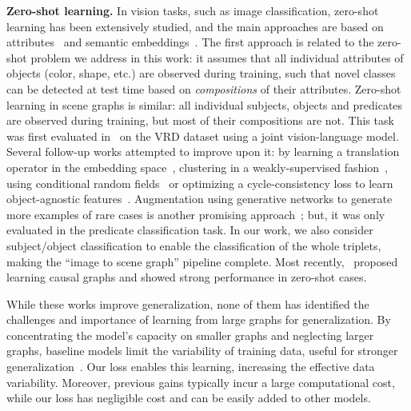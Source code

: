 \textbf{Zero-shot learning.}
In vision tasks, such as image classification, zero-shot learning has been extensively studied, and the main approaches are based on attributes~\citep{lampert2013attribute} and semantic embeddings~\citep{frome2013devise, xian2016latent}.
The first approach is related to the zero-shot problem we address in this work: it assumes that all individual attributes of objects (color, shape, etc.) are observed during training, such that novel classes can be detected at test time based on \textit{compositions} of their attributes.
Zero-shot learning in scene graphs is similar: all individual subjects, objects and predicates are observed during training, but most of their compositions are not. This task was first evaluated in~\citep{lu2016visual} on the VRD dataset using a joint vision-language model. 
Several follow-up works attempted to improve upon it: by learning a translation operator in the embedding space~\citep{zhang2017visual}, clustering in a weakly-supervised fashion~\citep{peyre2017weakly}, using conditional random fields~\citep{cong2018scene} or optimizing a cycle-consistency loss to learn object-agnostic features~\citep{yang2018shuffle}.
Augmentation using generative networks to generate more examples of rare cases is another promising approach~\citep{wang2019generating}; but, it was only evaluated in the predicate classification task. In our work, we also consider subject/object classification to enable the classification of the whole triplets, making the ``image to scene graph'' pipeline complete. Most recently,~\citet{tang2020unbiased} proposed learning causal graphs and showed strong performance in zero-shot cases.

While these works improve generalization, none of them has identified the challenges and importance of learning from large graphs for generalization. By concentrating the model's capacity on smaller graphs and neglecting larger graphs, baseline models limit the variability of training data, useful for stronger generalization~\citep{hill2019environmental}. Our loss enables this learning, increasing the effective data variability. Moreover, previous gains typically incur a large computational cost, while our loss has negligible cost and can be easily added to other models.


